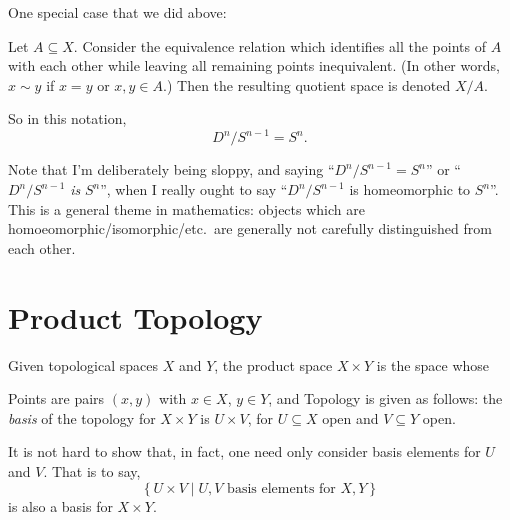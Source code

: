 \documentclass[11pt]{scrreprt}
\begin{document}
One special case that we did above:
\begin{definition}
	Let $A \subseteq X$.
	Consider the equivalence relation which identifies
	all the points of $A$ with each other
	while leaving all remaining points inequivalent.
	(In other words, $x \sim y$ if $x=y$ or $x,y \in A$.)
	Then the resulting quotient space is denoted $X/A$.
\end{definition}

So in this notation, \[ D^n / S^{n-1} = S^n. \]

\begin{abuse}
	Note that I'm deliberately being sloppy, and saying
	``$D^n / S^{n-1} = S^n$'' or ``$D^n / S^{n-1}$ \emph{is} $S^n$'',
	when I really ought to say ``$D^n / S^{n-1}$ is homeomorphic to $S^n$''.
	This is a general theme in mathematics:
	objects which are homoeomorphic/isomorphic/etc.\ are generally
	not carefully distinguished from each other.
\end{abuse}

\section{Product Topology}

\begin{definition}
	Given topological spaces $X$ and $Y$,
	the product space $X \times Y$ is the space whose
	\begin{itemize}
		\ii Points are pairs $(x,y)$ with $x \in X$, $y \in Y$, and
		\ii Topology is given as follows: the \emph{basis} of
		the topology for $X \times Y$ is $U \times V$,
		for $U \subseteq X$ open and $V \subseteq Y$ open.
	\end{itemize}
\end{definition}
\begin{remark}
	It is not hard to show that, in fact,
	one need only consider basis elements for $U$ and $V$.
	That is to say,
	\[ \left\{ U \times V \mid
		U,V \text{ basis elements for } X,Y \right\} \]
	is also a basis for $X \times Y$.
\end{remark}
\end{document}
